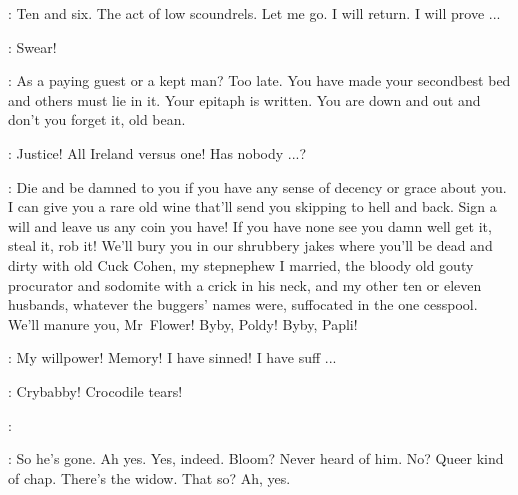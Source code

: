 \Bloom:
Ten and six.
The act of low scoundrels.
Let me go.
I will return.
I will prove ...

\Voice:
Swear!


\Bello:
As a paying guest or a kept man?
Too late.
You have made your secondbest bed and others must lie in it.
Your epitaph is written.
You are down and out and don't you forget it, old bean.%

\Bloom:
Justice!
All Ireland versus one!
Has nobody ...?

\Bello:
Die and be damned to you if you have any sense of decency or grace about you.
I can give you a rare old wine that'll send you skipping to hell and back.
Sign a will and leave us any coin you have!
If you have none see you damn well get it, steal it, rob it!
We'll bury you in our shrubbery jakes where you'll be dead and dirty with old Cuck Cohen,
my stepnephew I married, the bloody old gouty procurator and sodomite
with a crick in his neck, and my other ten or eleven husbands,
whatever the buggers' names were, suffocated in the one cesspool.
We'll manure you, Mr~Flower!
Byby, Poldy!
Byby, Papli!

\Bloom:
My willpower!
Memory!
I have sinned!
I have suff ...

\Bello:
Crybabby!
Crocodile tears!


\Circumcised:

\Voices:
So he's gone.
Ah yes.
Yes, indeed.
Bloom?
Never heard of him.
No?
Queer kind of chap.
There's the widow.
That so?
Ah, yes.


